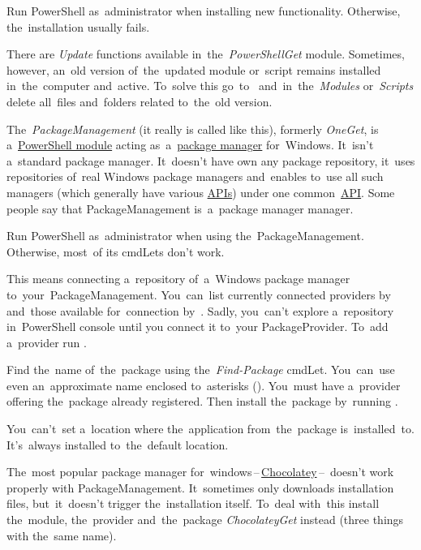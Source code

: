 \warning Run PowerShell as~administrator when installing new functionality. Otherwise, the~installation usually fails.

There are \textit{Update} functions available in~the~\textit{PowerShellGet} module. Sometimes, however, an~old version of~the~updated module or~script remains installed in~the~computer and~active. To~solve this go~to~ and~in~the~\textit{Modules} or~\textit{Scripts} delete all~files and~folders related to~the~old version.

\label{windowspackagemanagement}
The~\textit{PackageManagement} (it really is called like this), formerly \textit{OneGet}, is a~\hyperref[powershellmodule]{PowerShell module} acting as~a~\hyperref[packagemanager]{package manager} for~Windows. It~isn't a~standard package manager. It~doesn't have own any package repository, it~uses repositories of~real Windows package managers and~enables to~use all such managers (which generally have various \hyperref[api]{APIs}) under one common~\hyperref[api]{API}. Some people say that PackageManagement is~a~package manager manager.

\warning Run PowerShell as~administrator when using the~PackageManagement. Otherwise, most~of its cmdLets don't work.

This means connecting a~repository of~a~Windows package manager to~your~PackageManagement. You~can~list currently connected providers by~ and~those available for~connection by~. Sadly, you~can't explore a~repository in~PowerShell console until you connect it to~your PackageProvider. To~add a~provider run .

Find the~name of~the~package using the~\textit{Find-Package} cmdLet. You~can~use even an~approximate name enclosed to~asterisks (). You~must have a~provider offering the~package already registered. Then install the~package by~running .

\note You~can't~set a~location where the~application from~the~package is~installed~to. It's~always installed to~the~default location.

\warning The~most popular package manager for~windows\,--\,\href{https://chocolatey.org/}{Chocolatey}\,--\, doesn't work properly with PackageManagement. It~sometimes only downloads installation files, but~it~doesn't trigger the~installation itself. To~deal with~this install the~module, the~provider and~the~package \textit{ChocolateyGet} instead (three things with the~same name).
